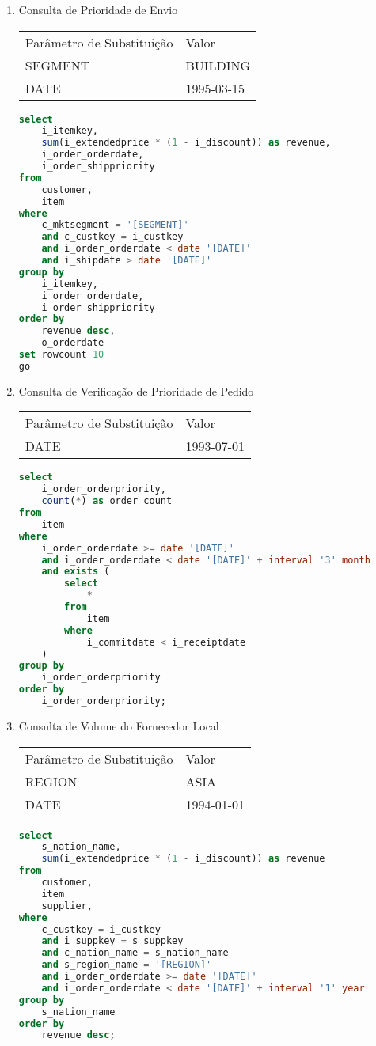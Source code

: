 \begin{enumerate}
\item Consulta de Prioridade de Envio
	
	\begin{tabular}{ll}
	Parâmetro de Substituição & Valor\\
	SEGMENT & BUILDING\\
	DATE & 1995-03-15\\
\end{tabular}

	\begin{lstlisting}[language=SQL]
select
	i_itemkey,
	sum(i_extendedprice * (1 - i_discount)) as revenue,
	i_order_orderdate,
	i_order_shippriority
from
	customer,
	item
where
	c_mktsegment = '[SEGMENT]'
	and c_custkey = i_custkey
	and i_order_orderdate < date '[DATE]'
	and i_shipdate > date '[DATE]'
group by
	i_itemkey,
	i_order_orderdate,
	i_order_shippriority
order by
	revenue desc,
	o_orderdate
set rowcount 10
go
	\end{lstlisting}
	
\item Consulta de Verificação de Prioridade de Pedido
	
	\begin{tabular}{ll}
	Parâmetro de Substituição & Valor\\
	DATE & 1993-07-01\\
\end{tabular}

	\begin{lstlisting}[language=SQL]
select
	i_order_orderpriority,
	count(*) as order_count
from
	item
where
	i_order_orderdate >= date '[DATE]'
	and i_order_orderdate < date '[DATE]' + interval '3' month
	and exists (
		select
			*
		from
			item
		where
			i_commitdate < i_receiptdate
	)
group by
	i_order_orderpriority
order by
	i_order_orderpriority;
	\end{lstlisting}

\item Consulta de Volume do Fornecedor Local
	
	\begin{tabular}{ll}
	Parâmetro de Substituição & Valor\\
	REGION & ASIA\\
	DATE & 1994-01-01\\
\end{tabular}

	\begin{lstlisting}[language=SQL]
select
	s_nation_name,
	sum(i_extendedprice * (1 - i_discount)) as revenue
from
	customer,
	item
	supplier,
where
	c_custkey = i_custkey
	and i_suppkey = s_suppkey
	and c_nation_name = s_nation_name
	and s_region_name = '[REGION]'
	and i_order_orderdate >= date '[DATE]'
	and i_order_orderdate < date '[DATE]' + interval '1' year
group by
	s_nation_name
order by
	revenue desc;
	\end{lstlisting}
	

\end{enumerate}

